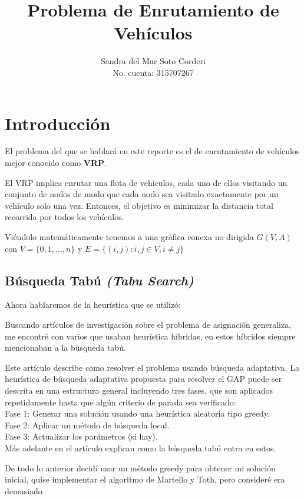 \documentclass{article}
\title{Problema de Enrutamiento de Veh\'iculos}
\author{
  Sandra del Mar Soto Corderi\\
  No. cuenta: 315707267
}
\date{}
\begin{document}
\maketitle

\section{Introducción}

El problema del que se hablará en este reporte es el de enrutamiento de vehículos mejor conocido como \textbf{VRP}. 

El VRP implica enrutar una flota de vehículos, cada uno de ellos visitando un conjunto de nodos de modo que cada nodo sea visitado exactamente por un vehículo solo una vez. Entonces, el objetivo es minimizar la distancia total recorrida por todos los vehículos.

Viéndolo matemáticamente tenemos a una gráfica conexa no dirigida $G(V,A)$ con $V = \{0,1,...,n\}$ y $E=\{(i,j): i,j \in V, i\neq j \}$

\subsection{Búsqueda Tabú \emph{(Tabu Search)}}
Ahora hablaremos de la heurística que se utilizó:

Buscando artículos de investigación sobre el problema de asignación generaliza, me encontré con varios que usaban heurística híbridas, en estos híbridos siempre mencionaban a la búsqueda tabú. 

Este artículo describe como resolver el problema usando búsqueda adaptativa. La heurística de búsqueda adaptativa propuesta para resolver el GAP puede ser descrita en una estructura general incluyendo tres fases, que son aplicados repetidamente hasta que algún criterio de parada sea verificado:\\

Fase 1: Generar una solución usando una heurística aleatoria tipo greedy.\\
Fase 2: Aplicar un método de búsqueda local.\\
Fase 3: Actualizar los parámetros (si hay).\\
Más adelante en el artículo explican como la búsqueda tabú entra en estos.

De todo lo anterior decidí usar un método greedy para obtener mi solución inicial, quise implementar el algoritmo de Martello y Toth, pero consideré era demasiado 
\end{document}
